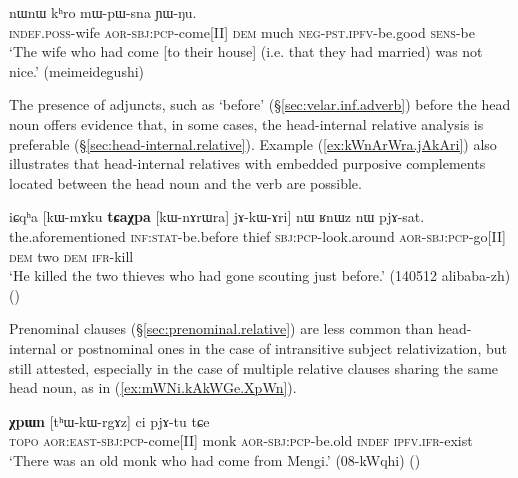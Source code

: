 \begin{exe}
\ex \label{ex:tArZaB.jAkWGe}
 nɯnɯ kʰro mɯ-pɯ-sna ɲɯ-ŋu.  \\
\textsc{indef}.\textsc{poss}-wife \textsc{aor}-\textsc{sbj}:\textsc{pcp}-come[II] \textsc{dem} much \textsc{neg}-\textsc{pst}.\textsc{ipfv}-be.good \textsc{sens}-be \\
\glt `The wife who had come [to their house] (i.e. that they had married) was not nice.' (meimeidegushi)
\end{exe} 

The presence of adjuncts, such as  `before' (§\ref{sec:velar.inf.adverb}) before the head noun offers evidence that, in some cases, the head-internal relative analysis is preferable (§\ref{sec:head-internal.relative}). Example (\ref{ex:kWnArWra.jAkAri}) also illustrates that head-internal relatives with embedded purposive complements located between the head noun and the verb are possible.

\begin{exe}
\ex \label{ex:kWnArWra.jAkAri}
\gll iɕqʰa [kɯ-mɤku \textbf{tɕaχpa} [kɯ-nɤrɯra] jɤ-kɯ-ɤri] nɯ ʁnɯz nɯ pjɤ-sat. \\
the.aforementioned \textsc{inf}:\textsc{stat}-be.before thief \textsc{sbj}:\textsc{pcp}-look.around \textsc{aor}-\textsc{sbj}:\textsc{pcp}-go[II]  \textsc{dem} two \textsc{dem} \textsc{ifr}-kill \\
\glt `He killed the two thieves who had gone scouting just before.' (140512 alibaba-zh)
()
\end{exe} 

Prenominal clauses (§\ref{sec:prenominal.relative}) are less common than head-internal or postnominal ones in the case of intransitive subject relativization, but still attested, especially in the case of multiple relative clauses sharing the same head noun, as in (\ref{ex:mWNi.kAkWGe.XpWn}).
 
\begin{exe}
\ex \label{ex:mWNi.kAkWGe.XpWn}
\gll 	 [mɯŋi kɤ-kɯ-ɣe] \textbf{χpɯn} [tʰɯ-kɯ-rgɤz] ci pjɤ-tu tɕe \\
\textsc{topo} \textsc{aor}:\textsc{east}-\textsc{sbj}:\textsc{pcp}-come[II] monk \textsc{aor}-\textsc{sbj}:\textsc{pcp}-be.old \textsc{indef} \textsc{ipfv}.\textsc{ifr}-exist \\
\glt `There was an old monk who had come from Mengi.' (08-kWqhi)
()
\end{exe} 

